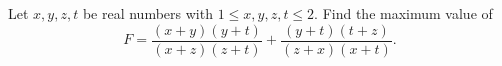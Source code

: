 Let $x,y,z,t$ be real numbers with $1\le x,y,z,t\le2$. Find the maximum value of
\[
F=\dfrac{(x+y)(y+t)}{(x+z)(z+t)}+\dfrac{(y+t)(t+z)}{(z+x)(x+t)} .
\]
